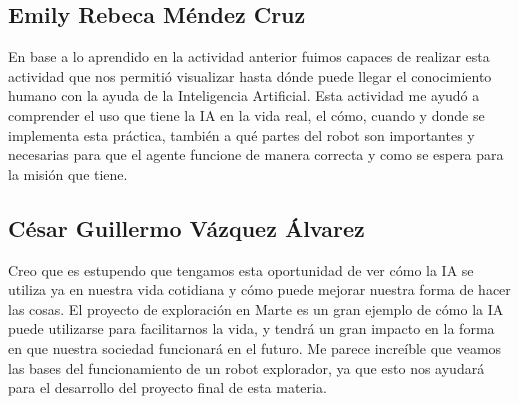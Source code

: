 \documentclass{article}
\begin{document}
        \subsection{Emily Rebeca Méndez Cruz}
            En base a lo aprendido en la actividad anterior fuimos capaces de realizar esta actividad que nos permitió visualizar hasta dónde puede llegar el conocimiento humano con la ayuda de la Inteligencia Artificial. Esta actividad me ayudó a comprender el uso que tiene la IA en la vida real, el cómo, cuando y donde se implementa esta práctica, también a qué partes del robot son importantes y necesarias para que el agente funcione de manera correcta y como se espera para la misión que tiene.

        \subsection{César Guillermo Vázquez Álvarez}
            Creo que es estupendo que tengamos esta oportunidad de ver cómo la IA se utiliza ya en nuestra vida cotidiana y cómo puede mejorar nuestra forma de hacer las cosas. El proyecto de exploración en Marte es un gran ejemplo de cómo la IA puede utilizarse para facilitarnos la vida, y tendrá un gran impacto en la forma en que nuestra sociedad funcionará en el futuro. Me parece increíble que veamos las bases del funcionamiento de un robot explorador, ya que esto nos ayudará para el desarrollo del proyecto final de esta materia.

    \clearpage
    \nocite{*}
    \printbibliography
\end{document}
